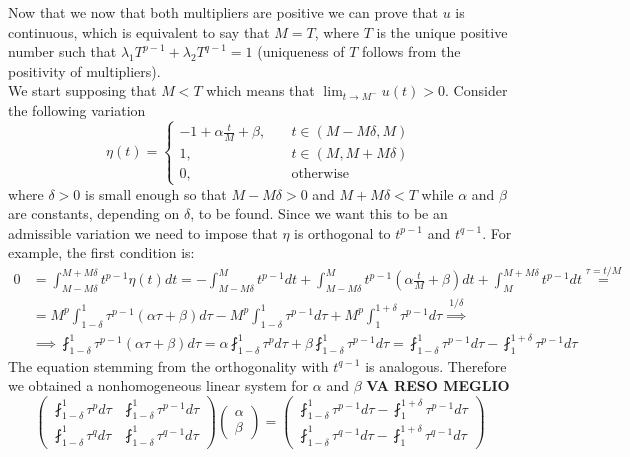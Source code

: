 \documentclass[corpo=11pt, stile=classica, tipotesi=custom,
greek, evenboxes, english]{toptesi}
\numberwithin{equation}{chapter}
\begin{document}
Now that we now that both multipliers are positive we can prove that $u$ is continuous, which is equivalent to say that $M=T$, where $T$ is the unique positive number such that $\lambda_1 T^{p-1} + \lambda_2 T^{q-1} = 1$ (uniqueness of $T$ follows from the positivity of multipliers).\\
We start supposing that $M < T$ which means that $\lim_{t \rightarrow M^-} u(t) > 0$. Consider the following variation 
\begin{equation*}
	\eta(t) = \left\{
	\begin{aligned}
		-1 + \alpha \frac{t}{M} + \beta,\quad & t \in (M-M\delta,M)\\
		1,\quad					   & t \in (M,M+M\delta)\\
		0,\quad				   & \text{otherwise}
	\end{aligned}\right.
\end{equation*}
where $\delta>0$ is small enough so that $M-M\delta >0$ and $M+M\delta < T$ while $\alpha$ and $\beta$ are constants, depending on $\delta$, to be found. Since we want this to be an admissible variation we need to impose that $\eta$ is orthogonal to $t^{p-1}$ and $t^{q-1}$. For example, the first condition is:
\begin{align*}
	0 &= \int_{M-M\delta}^{M+M\delta} t^{p-1} \eta(t) dt = -\int_{M-M\delta}^M t^{p-1}dt + \int_{M-M\delta}^M t^{p-1}\left(\alpha \frac{t}{M} + \beta\right) dt + \int_M^{M+M\delta} t^{p-1}dt \overset{\tau=t/M}{=}\\
	  &= M^p \int_{1-\delta}^1 \tau^{p-1}(\alpha \tau + \beta) d\tau - M^p \int_{1-\delta}^1 \tau^{p-1} d\tau + M^p \int_1^{1+\delta} \tau^{p-1} d\tau \overset{1/\delta}{\implies}\\
	  &\implies \fint_{1-\delta}^1 \tau^{p-1}(\alpha \tau + \beta) d\tau = \alpha \fint_{1-\delta}^1 \tau^{p} d\tau + \beta \fint_{1-\delta}^1 \tau^{p-1} d\tau = \fint_{1-\delta}^1 \tau^{p-1} d\tau - \fint_1^{1+\delta} \tau^{p-1} d\tau 
\end{align*}
The equation stemming from the orthogonality with $t^{q-1}$ is analogous. Therefore we obtained a nonhomogeneous linear system for $\alpha$ and $\beta$
\textbf{VA RESO MEGLIO}
\begin{equation}\label{system continuity}
	\begin{pmatrix}
		\fint_{1-\delta}^1 \tau^{p} d\tau &  \fint_{1-\delta}^1 \tau^{p-1} d\tau\\
		\fint_{1-\delta}^1 \tau^{q} d\tau & \fint_{1-\delta}^1 \tau^{q-1} d\tau
	\end{pmatrix}
	\begin{pmatrix}
		\alpha\\
		\beta
	\end{pmatrix}=
	\begin{pmatrix}
		\fint_{1-\delta}^1 \tau^{p-1} d\tau - \fint_1^{1+\delta} \tau^{p-1} d\tau\\
		\fint_{1-\delta}^1 \tau^{q-1} d\tau - \fint_1^{1+\delta} \tau^{q-1} d\tau
	\end{pmatrix}
\end{equation}
\end{document}
